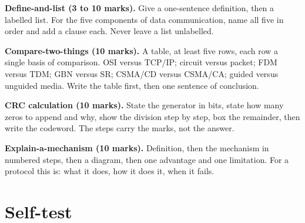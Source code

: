 \documentclass[11pt,a4paper]{article}
\begin{document}
\begin{answerbox}
\textbf{Define-and-list (3 to 10 marks).} Give a one-sentence definition, then a labelled list. For the five components of data communication, name all five in order and add a clause each. Never leave a list unlabelled.
\end{answerbox}

\begin{answerbox}
\textbf{Compare-two-things (10 marks).} A table, at least five rows, each row a single basis of comparison. OSI versus TCP/IP; circuit versus packet; FDM versus TDM; GBN versus SR; CSMA/CD versus CSMA/CA; guided versus unguided media. Write the table first, then one sentence of conclusion.
\end{answerbox}

\begin{answerbox}
\textbf{CRC calculation (10 marks).} State the generator in bits, state how many zeros to append and why, show the division step by step, box the remainder, then write the codeword. The steps carry the marks, not the answer.
\end{answerbox}

\begin{answerbox}
\textbf{Explain-a-mechanism (10 marks).} Definition, then the mechanism in numbered steps, then a diagram, then one advantage and one limitation. For a protocol this is: what it does, how it does it, when it fails.
\end{answerbox}

\section{Self-test}
\end{document}
